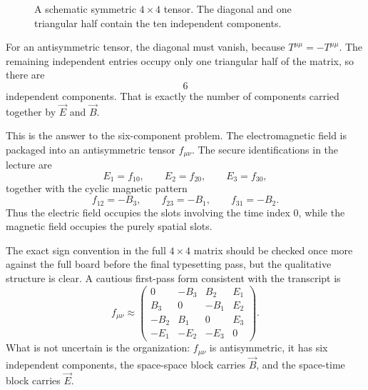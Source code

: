 \begin{figure}
\centering
{}
\caption{A schematic symmetric \(4\times4\) tensor. The diagonal and one triangular half contain the ten independent components.}
\end{figure}

For an antisymmetric tensor, the diagonal must vanish, because \(T^{\mu\mu}=-T^{\mu\mu}\). The remaining independent entries occupy only one triangular half of the matrix, so there are
\begin{equation}
6
\end{equation}
independent components. That is exactly the number of components carried together by \(\vec E\) and \(\vec B\).

This is the answer to the six-component problem. The electromagnetic field is packaged into an antisymmetric tensor \(f_{\mu\nu}\). The secure identifications in the lecture are
\begin{equation}
E_1=f_{10},
\qquad
E_2=f_{20},
\qquad
E_3=f_{30},
\end{equation}
together with the cyclic magnetic pattern
\begin{equation}
f_{12}=-B_3,
\qquad
f_{23}=-B_1,
\qquad
f_{31}=-B_2.
\end{equation}
Thus the electric field occupies the slots involving the time index \(0\), while the magnetic field occupies the purely spatial slots.

The exact sign convention in the full \(4\times4\) matrix should be checked once more against the full board before the final typesetting pass, but the qualitative structure is clear. A cautious first-pass form consistent with the transcript is
\begin{equation}
f_{\mu\nu}\approx
\begin{pmatrix}
0 & -B_3 & B_2 & E_1\\
B_3 & 0 & -B_1 & E_2\\
-B_2 & B_1 & 0 & E_3\\
-E_1 & -E_2 & -E_3 & 0
\end{pmatrix}.
\end{equation}
What is not uncertain is the organization: \(f_{\mu\nu}\) is antisymmetric, it has six independent components, the space-space block carries \(\vec B\), and the space-time block carries \(\vec E\).

